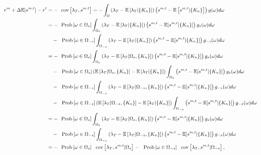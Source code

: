 \begin{equation*}
  \small
  \begin{split}
    r^m+ \Delta
    \mathbb{E}[s^{m,t}]-r^t&=-\text{cov}\left[\lambda_T,s^{m,t}\right]
    = -\int_{\Omega} \left(\lambda_T - \mathbb{E}\left[\lambda_T|\{K_n\}\right]\right) \left(s^{m,t}-\mathbb{E}\left[s^{m,t}|\{K_n\}\right]\right)g(\omega)d\omega\\
    &= -\text{Prob}\left[\omega\in\Omega_s\right] \int_{\Omega_s} \left(\lambda_T - \mathbb{E}\left[\lambda_T|\{K_n\}\right]\right) \left(s^{m,t}-\mathbb{E}[s^{m,t}|\{K_n\}]\right)g_s(\omega)d\omega\\
    &\quad -\text{Prob}\left[\omega\in\Omega_{-s}\right] \int_{\Omega_{-s}}\left(\lambda_T - \mathbb{E}\left[\lambda_T|\{K_n\}\right]\right) \left(s^{m,t}-\mathbb{E}[s^{m,t}|\{K_n\}]\right)g_{-s}(\omega)d\omega\\
    &= -\text{Prob}\left[\omega\in\Omega_s\right] \int_{\Omega_s} \left(\lambda_T - \mathbb{E}\left[\lambda_T|\Omega_s,\{K_n\}\right]\right) \left(s^{m,t}-\mathbb{E}[s^{m,t}|\{K_n\}]\right)g_s(\omega)d\omega\\
    &\quad -\text{Prob}\left[\omega\in\Omega_s\right] \left(
      \mathbb{E}\left[\lambda_T|\Omega_s,\{K_n\}\right]-\mathbb{E}\left[\lambda_T|
        \{K_n\}\right]\right) \int_{\Omega_s} \left(s^{m,t}-\mathbb{E}[s^{m,t}|\{K_n\}]\right)g_s(\omega)d\omega\\
    &\quad -\text{Prob}\left[\omega\in\Omega_{-s}\right] \int_{\Omega_{-s}} \left(\lambda_T - \mathbb{E}\left[\lambda_T|\Omega_{-s},\{K_n\}\right]\right) \left(s^{m,t}-\mathbb{E}[s^{m,t}|\{K_n\}]\right)g_{-s}(\omega)d\omega\\
    &\quad -\text{Prob}\left[\omega\in\Omega_{-s}\right] \left(
      \mathbb{E}\left[\lambda_T|\Omega_{-s},\{K_n\}\right]-\mathbb{E}\left[\lambda_T|
        \{K_n\}\right]\right) \int_{\Omega_{-s}} \left(s^{m,t}-\mathbb{E}[s^{m,t}|\{K_n\}]\right)g_{-s}(\omega)d\omega\\
    &= -\text{Prob}\left[\omega\in\Omega_s\right] \int_{\Omega_s} \left(\lambda_T - \mathbb{E}\left[\lambda_T|\Omega_s,\{K_n\}\right]\right) \left(s^{m,t}-\mathbb{E}[s^{m,t}|\{K_n\}]\right)g_s(\omega)d\omega\\
    &\quad -\text{Prob}\left[\omega\in\Omega_{-s}\right] \int_{\Omega_{-s}} \left(\lambda_T - \mathbb{E}\left[\lambda_T|\Omega_{-s},\{K_n\}\right]\right) \left(s^{m,t}-\mathbb{E}[s^{m,t}|\{K_n\}]\right)g_{-s}(\omega)d\omega\\
    &= -\text{Prob}\left[\omega\in\Omega_s\right]
    \text{cov}\left[\lambda_T,s^{m,t}|\Omega_s\right]-\text{Prob}\left[\omega\in\Omega_{-s}\right]
    \text{cov}\left[\lambda_T,s^{m,t}|\Omega_{-s}\right],
  \end{split}
\end{equation*}
